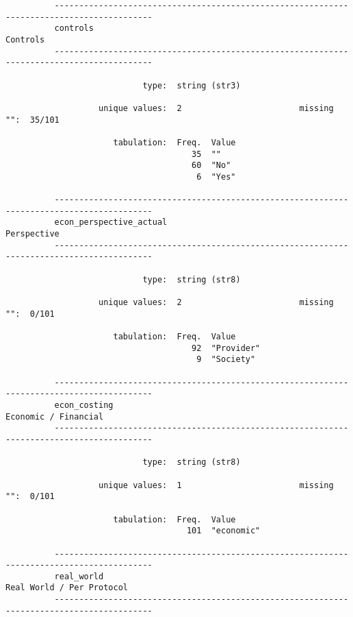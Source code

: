 \documentclass{article}
\begin{document}
\begin{verbatim}
          ------------------------------------------------------------------------------------------
          controls                                                                          Controls
          ------------------------------------------------------------------------------------------
          
                            type:  string (str3)
          
                   unique values:  2                        missing "":  35/101
          
                      tabulation:  Freq.  Value
                                      35  ""
                                      60  "No"
                                       6  "Yes"
          
          ------------------------------------------------------------------------------------------
          econ_perspective_actual                                                        Perspective
          ------------------------------------------------------------------------------------------
          
                            type:  string (str8)
          
                   unique values:  2                        missing "":  0/101
          
                      tabulation:  Freq.  Value
                                      92  "Provider"
                                       9  "Society"
          
          ------------------------------------------------------------------------------------------
          econ_costing                                                          Economic / Financial
          ------------------------------------------------------------------------------------------
          
                            type:  string (str8)
          
                   unique values:  1                        missing "":  0/101
          
                      tabulation:  Freq.  Value
                                     101  "economic"
          
          ------------------------------------------------------------------------------------------
          real_world                                                       Real World / Per Protocol
          ------------------------------------------------------------------------------------------
          

\end{verbatim}
\end{document}
